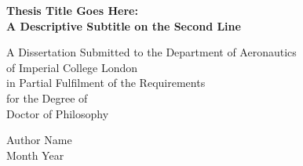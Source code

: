 \documentclass[10pt, twoside, a4paper]{report}
\begin{document}
\pagestyle{fancy}
\fancyhf{} %
\fancyfoot[R]{\thepage}


\begin{titlepage}
    \begin{center}
        \vspace*{4em}

        {\Large\bfseries
            Thesis Title Goes Here: \\[0.4em]
            A Descriptive Subtitle on the Second Line
        }

        \vspace{4em}

        {\normalsize
            A Dissertation Submitted to the Department of Aeronautics \\[0.3em]
            of Imperial College London \\[0.3em]
            in Partial Fulfilment of the Requirements \\[0.3em]
            for the Degree of \\[0.3em]
            Doctor of Philosophy
        }

        \vspace*{\fill}

        Author Name \\[0.3em]
        Month Year

    \end{center}
\end{titlepage}


\newpage

\newpage

\newpage

\tableofcontents
\newpage

\listoffigures
\newpage

\listoftables
\newpage


\newpage

\printnomenclature
\newpage





\clearpage
{}




\end{document}

